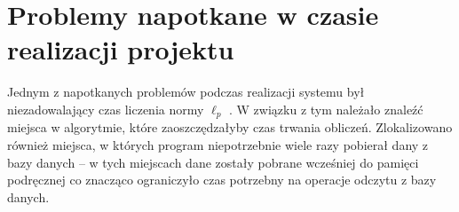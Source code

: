 \documentclass[pdflatex,11pt]{../aghdoc_version2}
\begin{document}
\section{Problemy napotkane w czasie realizacji projektu}
Jednym z napotkanych problemów podczas realizacji systemu był niezadowalający czas
liczenia normy $\ell_p$ . W związku z tym należało znaleźć miejsca w algorytmie, które
zaoszczędzałyby czas trwania obliczeń. Zlokalizowano również miejsca, w których program
niepotrzebnie wiele razy pobierał dany z bazy danych – w tych miejscach dane zostały pobrane wcześniej do pamięci podręcznej co znacząco ograniczyło czas potrzebny na operacje odczytu z bazy danych.
% 
% 



%
%
%
%
\end{document}

